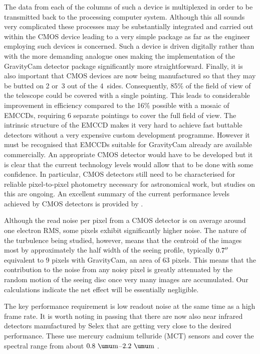 \documentclass{pasa}%
\newcommand\arcsec{\hbox{$^{\prime\prime}$}}
\begin{document}
The data from each of the columns of such a device is multiplexed in order to be transmitted back to the processing computer system.  Although this all sounds very complicated these processes may be substantially integrated and carried out within the CMOS device leading to a very simple package as far as the engineer employing such devices is concerned.  Such a device is driven digitally rather than with the more demanding analogue ones making the implementation of the \mbox{GravityCam} detector package significantly more straightforward.  Finally, it is also important that CMOS devices are now being manufactured so that they may be butted on 2 or~3 out of the 4~sides. Consequently, 85\% of the field of view of the telescope could be covered with a single pointing. This leads to considerable improvement in efficiency compared to the 16\% possible with a mosaic of EMCCDs, requiring 6 separate pointings to cover the full field of view. The intrinsic structure of the EMCCD makes it very hard to achieve fast buttable detectors without a very expensive custom development programme.  However it must be recognised that EMCCDs suitable for \mbox{GravityCam} already are available commercially. An appropriate CMOS detector would have to be developed but it is clear that the current technology levels would allow that to be done with some confidence. In particular, CMOS detectors still need to be characterised for reliable pixel-to-pixel photometry necessary for astronomical work, but studies on this are ongoing. An excellent summary of the current performance levels achieved by CMOS detectors is provided by \citet{Janesick2017}. %

Although the read noise per pixel from a CMOS detector is on average
around one electron RMS, some pixels exhibit significantly higher noise.
The nature of the turbulence being studied, however, means that the
centroid of the images most by approximately the half width of the
seeing profile, typically $0.7\arcsec$ equivalent to 9 pixels with
\mbox{GravityCam}, an area of 63 pixels. This means that the contribution to
the noise from any noisy pixel is greatly attenuated by the random
motion of the seeing disc once very many images are accumulated. Our
calculations indicate the net effect will be essentially negligible.

The key performance requirement is low readout noise at the same time as a high frame rate.  It is worth noting in passing that there are now also near infrared detectors manufactured by Selex \citep{Finger+2016} that are getting very close to the desired performance.  These use mercury cadmium telluride (MCT) sensors and cover the spectral range from about $0.8~\umu\mbox{m}$--$2.2~\umu\mbox{m}$
\citep{Hall+2016}.
\end{document}
